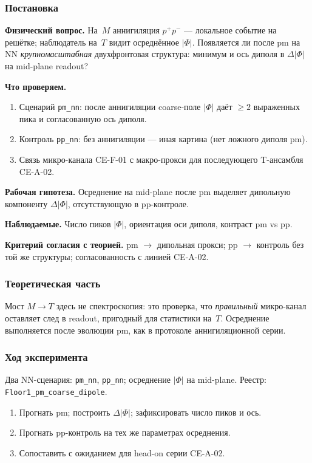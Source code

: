 \label{exp:cea01}

\subsubsection*{Постановка}
\textbf{Физический вопрос.}
На~$M$ аннигиляция $p^+p^-$ --- локальное событие на решётке; наблюдатель на~$T$ видит осреднённое $|\Phi|$.
Появляется ли после pm на NN \emph{крупномасштабная} двухфронтовая структура: минимум и ось диполя в $\Delta|\Phi|$ на mid-plane readout?

\textbf{Что проверяем.}
\begin{enumerate}[label=\textbf{(\alph*)},leftmargin=*,itemsep=0.25em]
\item Сценарий \texttt{pm\_nn}: после аннигиляции coarse-поле $|\Phi|$ даёт $\ge 2$ выраженных пика и согласованную ось диполя.
\item Контроль \texttt{pp\_nn}: без аннигиляции --- иная картина (нет ложного диполя pm).
\item Связь микро-канала CE-F-01 с макро-прокси для последующего T-ансамбля CE-A-02.
\end{enumerate}

\textbf{Рабочая гипотеза.}
Осреднение на mid-plane после pm выделяет дипольную компоненту $\Delta|\Phi|$, отсутствующую в pp-контроле.

\textbf{Наблюдаемые.}
Число пиков $|\Phi|$, ориентация оси диполя, контраст pm vs pp.

\textbf{Критерий согласия с теорией.}
pm $\to$ дипольная прокси; pp $\to$ контроль без той же структуры; согласованность с линией CE-A-02.

\subsubsection*{Теоретическая часть}
Мост $M\to T$ здесь не спектроскопия: это проверка, что \emph{правильный} микро-канал оставляет след в readout, пригодный для статистики на~$T$.
Осреднение выполняется после эволюции pm, как в протоколе аннигиляционной серии.

\subsubsection*{Ход эксперимента}
Два NN-сценария: \texttt{pm\_nn}, \texttt{pp\_nn}; осреднение $|\Phi|$ на mid-plane.
Реестр: \texttt{Floor1\_pm\_coarse\_dipole}.

\begin{enumerate}[label=\textbf{Шаг \arabic*:},leftmargin=*,itemsep=0.35em]
\item Прогнать pm; построить $\Delta|\Phi|$; зафиксировать число пиков и ось.
\item Прогнать pp-контроль на тех же параметрах осреднения.
\item Сопоставить с ожиданием для head-on серии CE-A-02.
\end{enumerate}

